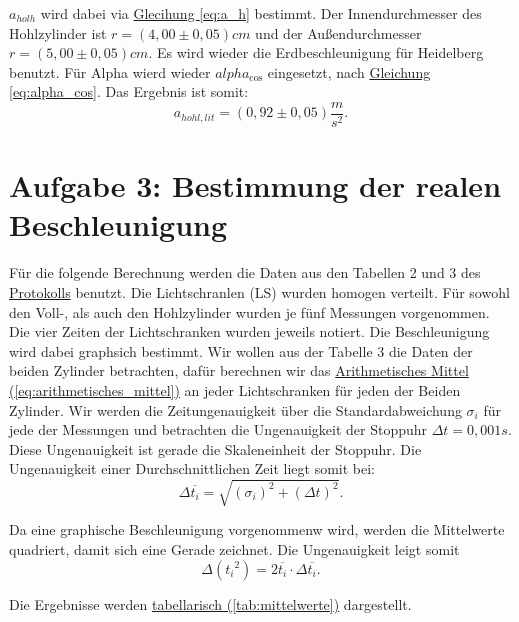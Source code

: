 \newpage

$a_{holh}$ wird dabei via \hyperref[eq:a_h]{Glecihung \ref*{eq:a_h}} bestimmt. Der Innendurchmesser des Hohlzylinder ist $r = (4,00 \pm 0,05) cm$ und der Außendurchmesser $r = (5,00 \pm 0,05) cm$. Es wird wieder die Erdbeschleunigung für Heidelberg benutzt. Für Alpha wierd wieder $alpha_{\cos}$ eingesetzt, nach \hyperref[eq:alpha_cos]{Gleichung \ref*{eq:alpha_cos}}. Das Ergebnis ist somit:
\begin{equation}
    \boxed{
        a_{hohl,lit} = (0,92 \pm 0,05) \frac{m}{s^2}
    }.
    \label{eq:a_h_l}
\end{equation}

\newpage

\section{Aufgabe 3: Bestimmung der realen Beschleunigung}
Für die folgende Berechnung werden die Daten aus den Tabellen 2 und 3 des \hyperref[Protokoll]{Protokolls} benutzt. Die Lichtschranlen (LS) wurden homogen verteilt. Für sowohl den Voll-, als auch den Hohlzylinder wurden je fünf Messungen vorgenommen. Die vier Zeiten der Lichtschranken wurden jeweils notiert. Die Beschleunigung wird dabei graphsich bestimmt. 
Wir wollen aus der Tabelle 3 die Daten der beiden Zylinder betrachten, dafür berechnen wir das \hyperref[eq:arithmetisches_mittel]{Arithmetisches Mittel (\ref*{eq:arithmetisches_mittel})} an jeder Lichtschranken für jeden der Beiden Zylinder. Wir werden die Zeitungenauigkeit über die Standardabweichung $\sigma_i$ für jede der Messungen und betrachten die Ungenauigkeit der Stoppuhr $\Delta t = 0,001s$. Diese Ungenauigkeit ist gerade die Skaleneinheit der Stoppuhr. Die Ungenauigkeit einer Durchschnittlichen Zeit liegt somit bei:
\begin{equation}
    \Delta \overline{t_i} = \sqrt{(\sigma_i)^2 + (\Delta t)^2}.
\end{equation}

Da eine graphische Beschleunigung vorgenommenw wird, werden die Mittelwerte quadriert, damit sich eine Gerade zeichnet. Die Ungenauigkeit leigt somit
\begin{equation}
    \Delta ({t_i}^2) = 2 \overline{t_i} \cdot \Delta \overline{t_i}.
\end{equation}

Die Ergebnisse werden \hyperref[tab:mittelwerte]{tabellarisch (\ref*{tab:mittelwerte})} dargestellt.

